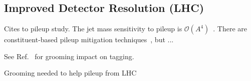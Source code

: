 \subsection{Improved Detector Resolution (LHC)}

Cites to pileup study. The jet mass sensitivity to pileup is $\mathcal{O}(A^4)$~\cite{Salam:2009jx}.  There are constituent-based pileup mitigation techniques~\cite{Cacciari:2014gra,Krohn:2013lba,Bertolini:2014bba,Berta:2014eza,Komiske:2017ubm}, but ...

See Ref.~\cite{Aad:2015rpa} for grooming impact on tagging.

Grooming needed to help pileup from LHC

